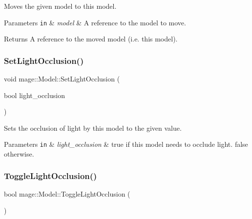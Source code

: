 Moves the given model to this model.


\begin{DoxyParams}[1]{Parameters}
\mbox{\tt in}  & {\em model} & A reference to the model to move. \\
\hline
\end{DoxyParams}
\begin{DoxyReturn}{Returns}
A reference to the moved model (i.\+e. this model). 
\end{DoxyReturn}
\hypertarget{classmage_1_1_model_aabcd12eeab9d6b81e27c727cb94cf57a}{}\label{classmage_1_1_model_aabcd12eeab9d6b81e27c727cb94cf57a} 
\subsubsection{\texorpdfstring{Set\+Light\+Occlusion()}{SetLightOcclusion()}}
{\footnotesize\ttfamily void mage\+::\+Model\+::\+Set\+Light\+Occlusion (\begin{DoxyParamCaption}\item[{bool}]{light\+\_\+occlusion }\end{DoxyParamCaption})\hspace{0.3cm}{\ttfamily [noexcept]}}

Sets the occlusion of light by this model to the given value.


\begin{DoxyParams}[1]{Parameters}
\mbox{\tt in}  & {\em light\+\_\+occlusion} & {\ttfamily true} if this model needs to occlude light. {\ttfamily false} otherwise. \\
\hline
\end{DoxyParams}
\hypertarget{classmage_1_1_model_a68168e66cb04c08f27616e9d7768a99e}{}\label{classmage_1_1_model_a68168e66cb04c08f27616e9d7768a99e} 
\subsubsection{\texorpdfstring{Toggle\+Light\+Occlusion()}{ToggleLightOcclusion()}}
{\footnotesize\ttfamily bool mage\+::\+Model\+::\+Toggle\+Light\+Occlusion (\begin{DoxyParamCaption}{ }\end{DoxyParamCaption})\hspace{0.3cm}{\ttfamily [noexcept]}}

